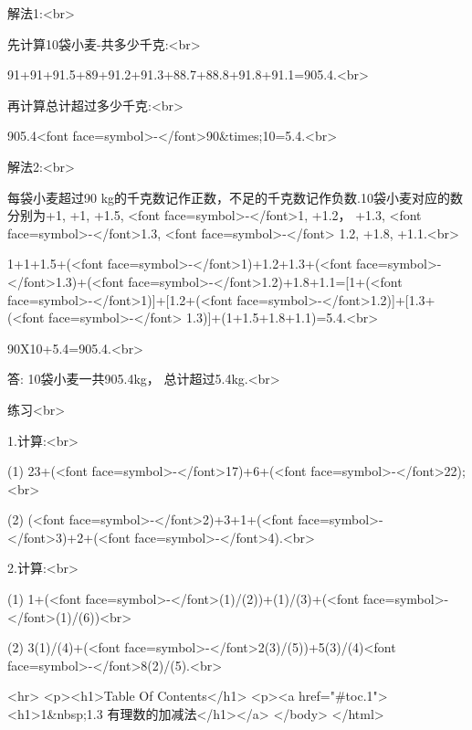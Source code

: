     
    解法1:<br>

    
    先计算10袋小麦-共多少千克:<br>


    91+91+91.5+89+91.2+91.3+88.7+88.8+91.8+91.1=905.4.<br>

    
    再计算总计超过多少千克:<br>

    
    905.4<font face=symbol>-</font>90&times;10=5.4.<br>


    解法2:<br>

    每袋小麦超过90 kg的千克数记作正数，不足的千克数记作负数.10袋小麦对应的数分别为+1, +1, +1.5, <font face=symbol>-</font>1, +1.2， +1.3, <font face=symbol>-</font>1.3, <font face=symbol>-</font> 1.2, +1.8, +1.1.<br>


    1+1+1.5+(<font face=symbol>-</font>1)+1.2+1.3+(<font face=symbol>-</font>1.3)+(<font face=symbol>-</font>1.2)+1.8+1.1=[1+(<font face=symbol>-</font>1)]+[1.2+(<font face=symbol>-</font>1.2)]+[1.3+(<font face=symbol>-</font> 1.3)]+(1+1.5+1.8+1.1)=5.4.<br>

    
    90X10+5.4=905.4.<br>


    答: 10袋小麦一共905.4kg， 总计超过5.4kg.<br>

    
\endexample

\beginexercise
    
    练习<br>


    1.计算:<br>


    (1) 23+(<font face=symbol>-</font>17)+6+(<font face=symbol>-</font>22);<br>

    
    (2) (<font face=symbol>-</font>2)+3+1+(<font face=symbol>-</font>3)+2+(<font face=symbol>-</font>4).<br>


    2.计算:<br>


    (1) 1+(<font face=symbol>-</font>(1)/(2))+(1)/(3)+(<font face=symbol>-</font>(1)/(6))<br>

    
    (2) 3(1)/(4)+(<font face=symbol>-</font>2(3)/(5))+5(3)/(4)<font face=symbol>-</font>8(2)/(5).<br>

    
\endexercise
    
    
    
    \enddocument
<hr>
<p><h1>Table Of Contents</h1>
<p><a href="#toc.1"><h1>1&nbsp;1.3 有理数的加减法</h1></a>
</body>
</html>
